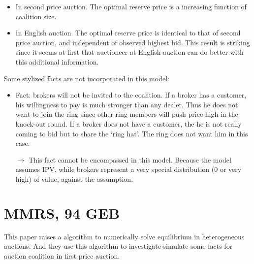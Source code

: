 \documentclass{book}
\theoremstyle{plain}
\theoremstyle{definition}
\begin{document}
\begin{itemize}
	\item In second price auction. The optimal reserve price is a increasing function of coalition size.
	\item In English auction. The optimal reserve price is identical to that of second price auction, and independent of observed highest bid. This result is striking since it seems at first that auctioneer at English auction can do better with this additional information.
\end{itemize}

Some stylized facts are not incorporated in this model:
\begin{itemize}
	\item Fact: brokers will not be invited to the coalition. If a broker has a customer, his willingness to pay is much stronger than any dealer. Thus he does not want to join the ring since other ring members will push price high in the knock-out round. If a broker does not have a customer, the he is not really coming to bid but to share the `ring hat'. The ring does not want him in this case.
	
	$\rightarrow$ This fact cannot be encompassed in this model. Because the model assumes IPV, while brokers represent a very special distribution (0 or very high) of value, against the assumption.
\end{itemize}


\section{MMRS, 94 GEB} %
\label{sec:marshall_meurer_richard_stromquist_94_geb}

\textbf{}

This paper raises a algorithm to numerically solve equilibrium in heterogeneous auctions.
And they use this algorithm to investigate simulate some facts for auction coalition in first price auction.
\end{document}
